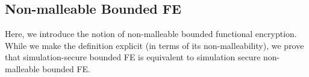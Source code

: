 


\subsection{Non-malleable Bounded FE}
Here, we introduce the notion of non-malleable bounded functional encryption.
While we make the definition explicit (in terms of its non-malleability), we prove
that simulation-secure bounded FE is equivalent to simulation secure non-malleable bounded FE.

